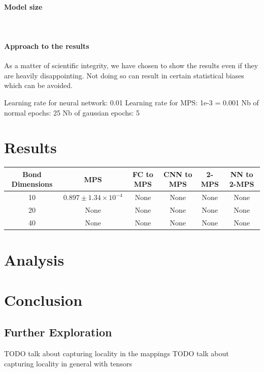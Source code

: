 \documentclass{article}
\theoremstyle{definition}
\theoremstyle{definition}
\begin{document}
\paragraph{Model size} ${}$ \\

\paragraph{Approach to the results}
As a matter of scientific integrity, we have chosen to show the 
results even if they are heavily disappointing. Not doing so 
can result in certain statistical biases which can be avoided.

Learning rate for neural network: 0.01
Learning rate for MPS: 1e-3 = 0.001
Nb of normal epochs: 25
Nb of gaussian epochs: 5


\section{Results}
\begin{tabular}{ | c | c | c | c | c | c | }
\hline 
Bond Dimensions & MPS & FC to MPS & CNN to MPS & 2-MPS & NN to 2-MPS \\ 
\hline
10 & $0.897 \pm 1.34 \times 10^{-4}$  & None & None & None & None \\
20 & None & None & None & None & None\\
40 & None & None & None & None & None\\
\hline
\end{tabular}

\section{Analysis}



\section{Conclusion}



\subsection{Further Exploration}
TODO talk about capturing locality in the mappings
TODO talk about capturing locality in general with tensors

\printbibliography
\end{document}
